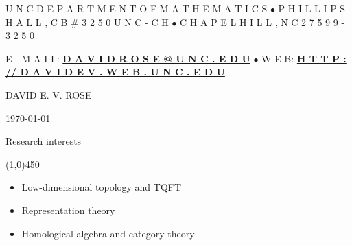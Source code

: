 \documentclass[10pt]{article}
\begin{document}
\centerline{\scriptsize U N C  \hspace{0.03in} D E P A R T M E N T  \hspace{0.03in}    O F \hspace{0.03in} M A T H E M A T I C S \hspace{0.03in} $\bullet$  
\hspace{0.03in} P H I L L I P S  \hspace{0.03in} H A L L , \hspace{0.03in} C B \# 3 2 5 0  \hspace{0.03in}  U N C - C H  \hspace{0.03in} $\bullet$ 
\hspace{0.03in} C H A P E L \hspace{0.03in} H I L L , \hspace{0.03in} N C  \hspace{0.03in} 2 7 5 9 9 - 3 2 5 0}

\vspace{0.04in}
\centerline{\scriptsize {E - M A I L:} \hspace{0.03in} {
        \href{mailto:davidrose@unc.edu}{\bf D A V I D R O S E @ U N C . E D U}} \hspace{0.03in}
        $\bullet$ \hspace{0.03in} W E B: \hspace{0.03in} \href{http://davidev.web.unc.edu/}{\bf H T T P : // D A V I D E V . W E B . U N C . E D U}}

\bigskip
\bigskip

\noindent
{\centerline{\Huge DAVID \hspace{0.03in} E. V. \hspace{0.01in} ROSE}}
\bigskip

{\centerline \today}

\bigskip


\noindent
{\large \sc Research interests}

\vspace{-0.1in}
\noindent
\line(1,0){450}

\smallskip


\begin{itemize} 
\item Low-dimensional topology and TQFT
\item Representation theory
\item Homological algebra and category theory

\end{itemize}
\end{document}
